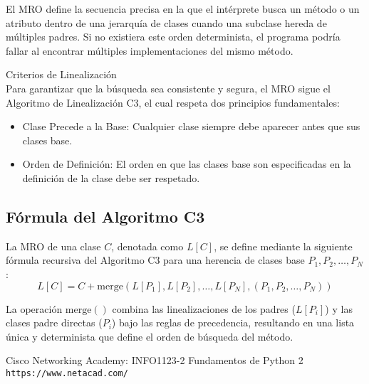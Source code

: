 \documentclass{article}
\begin{document}
El MRO define la secuencia precisa en la que el intérprete busca un método o un atributo dentro de una jerarquía de clases cuando una subclase hereda de múltiples padres. Si no existiera este orden determinista, el programa podría fallar al encontrar múltiples implementaciones del mismo método.

\vspace{1.0em}

\large{Criterios de Linealización}
\\
Para garantizar que la búsqueda sea consistente y segura, el MRO sigue el Algoritmo de Linealización C3, el cual respeta dos principios fundamentales:

\begin{itemize}
    \item {Clase Precede a la Base:} Cualquier clase siempre debe aparecer antes que sus clases base.
    \item {Orden de Definición:} El orden en que las clases base son especificadas en la definición de la clase debe ser respetado.
\end{itemize}

\subsection{Fórmula del Algoritmo C3}
La MRO de una clase $C$, denotada como $L[C]$, se define mediante la siguiente fórmula recursiva del Algoritmo C3 para una herencia de clases base $P_1, P_2, \dots, P_N$:
\begin{equation}
L[C] = C + \text{merge}(L[P_1], L[P_2], \dots, L[P_N], (P_1, P_2, \dots, P_N))
\label{eq:mro_c3}
\end{equation}

La operación $\text{merge}()$ combina las linealizaciones de los padres ($L[P_i]$) y las clases padre directas ($P_i$) bajo las reglas de precedencia, resultando en una lista única y determinista que define el orden de búsqueda del método.


\clearpage
\begin{thebibliography}{2}

Cisco Networking Academy: INFO1123-2 Fundamentos de Python 2
\\
\texttt{https://www.netacad.com/}

\end{thebibliography}
\end{document}
